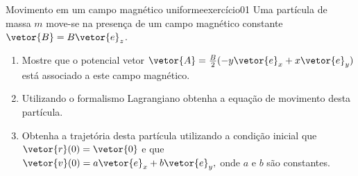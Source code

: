 \begin{exercício}{Movimento em um campo magnético uniforme}{exercício01}
    Uma partícula de massa \(m\) move-se na presença de um campo magnético constante \(\vetor{B} = B \vetor{e}_z\).
    \begin{enumerate}[label=(\alph*)]
        \item Mostre que o potencial vetor \(\vetor{A} = \frac{B}{2}(-y\vetor{e}_x + x \vetor{e}_y)\) está associado a este campo magnético.
        \item Utilizando o formalismo Lagrangiano obtenha a equação de movimento desta partícula.
        \item Obtenha a trajetória desta partícula utilizando a condição inicial que \(\vetor{r}(0) = \vetor{0}\) e que \(\vetor{v}(0) = a\vetor{e}_x + b\vetor{e}_y,\) onde \(a\) e \(b\) são constantes.
    \end{enumerate}
\end{exercício}
